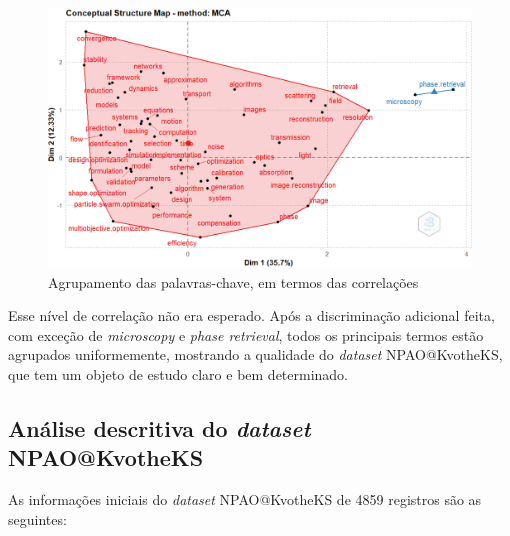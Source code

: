     \begin{figure}[H]
        \centering
        \includegraphics[width=1\textwidth]{experiments/KvotheKS/PesqBibliogr/AlgoritmosSimulacaoOptica-Dinamica/WoS-20220202/Clustering/Conceptual_structure_map.PNG}
        \caption{Agrupamento das palavras-chave, em termos das correlações}
        \label{fig:KvotheKS:Conceptual_structure_map}
    \end{figure}
    
    Esse nível de correlação não era esperado. Após a discriminação adicional feita, com exceção de \emph{microscopy} e \emph{phase retrieval}, todos os principais termos estão agrupados uniformemente, mostrando a qualidade do \emph{dataset} NPAO@KvotheKS, que tem um objeto de estudo claro e bem determinado.
\subsection{Análise descritiva do \emph{dataset} NPAO@KvotheKS}
    As informações iniciais do \emph{dataset} NPAO@KvotheKS de 4859 registros são as seguintes:
    
